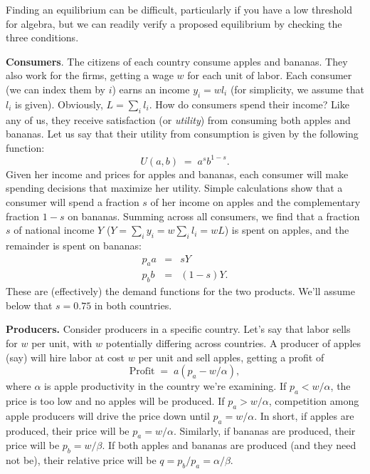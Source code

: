 Finding an equilibrium can be difficult, particularly if you have
a low threshold for algebra, but we can readily verify a
proposed equilibrium by checking the three conditions.

\textbf{Consumers}. The citizens of each country consume apples
and bananas.
They also work for the firms, getting a wage $w$ for each
unit of labor. Each consumer (we can index them by $i$) earns an
income $y_{i} = wl_{i}$ (for simplicity, we assume that $l_{i}$ is
given). Obviously, $L=\sum_{i}l_{i}$. How do consumers spend their
income? Like any of us, they receive satisfaction (or {\it utility\/})
from consuming both apples and bananas.  Let us say that
their utility from consumption is given by the following function:
\[
    U(a,b) \;=\; a^{s}b^{1-s}.
\]
Given her income and prices for apples and bananas, each consumer
will make spending decisions that maximize her utility.
Simple calculations show that a consumer will spend a fraction $s$
of her income on apples and the complementary fraction $1-s$ on
bananas. Summing across all consumers, we find that a
fraction $s$ of national income $Y$
($Y=\sum_{i}y_{i}=w\sum_{i}l_{i}=wL$) is spent on apples,
and the remainder is spent on bananas:
\begin{eqnarray*}
    p_{a}a &=& s Y  \\
    p_{b}b &=& (1-s)Y.
\end{eqnarray*}
These are (effectively) the demand functions for the two products.
We'll assume below that $s = 0.75$ in both countries.

\textbf{Producers.}  Consider producers in a specific country.
Let's say that labor sells for $w$ per unit,
with $w$ potentially differing across countries.
A producer of apples (say) will hire labor at cost $w$ per unit and sell
apples, getting a profit of
\[
    \mbox{Profit} \;=\;  a (p_{a} - w/\alpha) ,
\]
where $\alpha$ is apple productivity in the country we're examining.
If $p_{a} < w/\alpha$, the price is too low and no apples will be
produced. If $p_{a} > w/\alpha$, competition among apple producers
will drive the price down until $p_{a} = w/\alpha$.  In short, if
apples are produced, their price will be $p_{a} = w/\alpha$.
Similarly, if bananas are produced, their price will be $p_{b} =
w/\beta$. If both apples and bananas are produced (and they need
not be), their relative price will be $q = p_{b}/p_{a} = \alpha
/\beta $.

